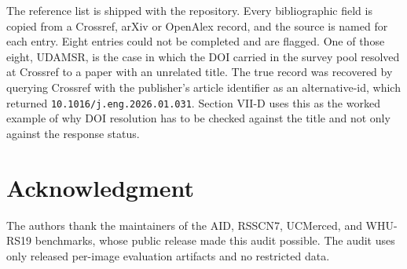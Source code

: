 \documentclass[journal,twoside,10pt]{IEEEtran}
\begin{document}
The reference list is shipped with the repository. Every bibliographic field is copied from a Crossref, arXiv or OpenAlex record, and the source is named for each entry. Eight entries could not be completed and are flagged. One of those eight, UDAMSR, is the case in which the DOI carried in the survey pool resolved at Crossref to a paper with an unrelated title. The true record was recovered by querying Crossref with the publisher's article identifier as an alternative-id, which returned \texttt{10.1016/j.eng.2026.01.031}. Section VII-D uses this as the worked example of why DOI resolution has to be checked against the title and not only against the response status.

\section*{Acknowledgment}


The authors thank the maintainers of the AID, RSSCN7, UCMerced, and WHU-RS19 benchmarks, whose public release made this audit possible. The audit uses only released per-image evaluation artifacts and no restricted data.
\end{document}
